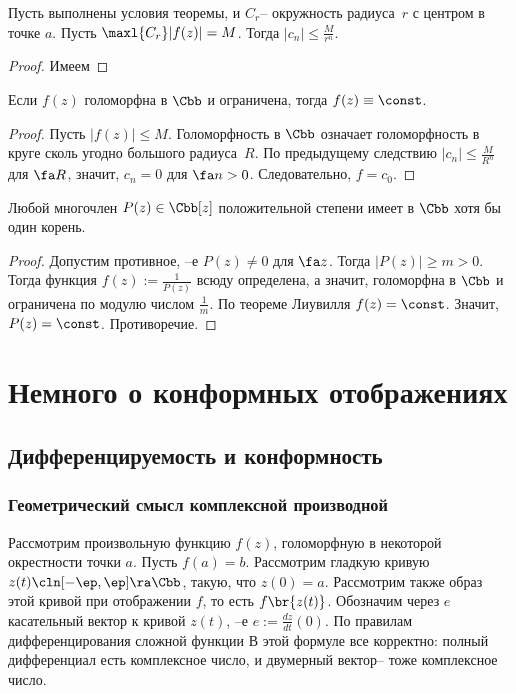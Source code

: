 \documentclass[a4paper]{article}
\begin{document}
\begin{imp}
Пусть выполнены условия теоремы, и $C_r$-- окружность радиуса~$r$ с центром в точке $a$.
Пусть $\maxl{C_r}|f(z)| = M$. Тогда $|c_n| \le \frac{M}{r^n}$.
\end{imp}
\begin{proof}
Имеем
\hfill\end{proof}

\begin{imp}
Если $f(z)$ голоморфна в $\Cbb$ и ограничена, тогда $f(z) \equiv \const$.
\end{imp}
\begin{proof}
Пусть $|f(z)| \le M$. Голоморфность в $\Cbb$ означает голоморфность в круге сколь
угодно большого радиуса~$R$. По предыдущему следствию $|c_n| \le \frac{M}{R^n}$ для $\fa R$, значит,
$c_n = 0$ для $\fa n > 0$. Следовательно, $f = c_0$.
\end{proof}
\begin{imp}
Любой многочлен $P(z) \in \Cbb[z]$ положительной степени имеет в $\Cbb$ хотя бы один корень.
\end{imp}
\begin{proof}
Допустим противное, --е $P(z)\neq 0$ для $\fa z$. Тогда $|P(z)| \ge m > 0$.
Тогда функция $f(z) := \frac{1}{P(z)}$ всюду определена, а значит, голоморфна в $\Cbb$ и ограничена по модулю
числом $\frac{1}{m}$. По теореме Лиувилля $f(z)=\const$. Значит, $P(z)=\const$. Противоречие.
\end{proof}

\section{Немного о конформных отображениях}

\subsection{Дифференцируемость и конформность}

\subsubsection{Геометрический смысл комплексной производной}

Рассмотрим произвольную функцию $f(z)$, голоморфную в некоторой окрестности точки $a$. Пусть $f(a)=b$.
Рассмотрим гладкую кривую $z(t)\cln [-\ep,\ep]\ra \Cbb$, такую, что $z(0)=a$. Рассмотрим также образ
этой кривой при отображении $f$, то есть $f\br{z(t)}$.
Обозначим через $e$ касательный вектор к кривой $z(t)$, --е $e := \frac{dz}{dt}(0)$.
По правилам дифференцирования сложной функции
В этой формуле все корректно: полный дифференциал есть комплексное число, и двумерный вектор-- тоже
комплексное число.
\end{document}
